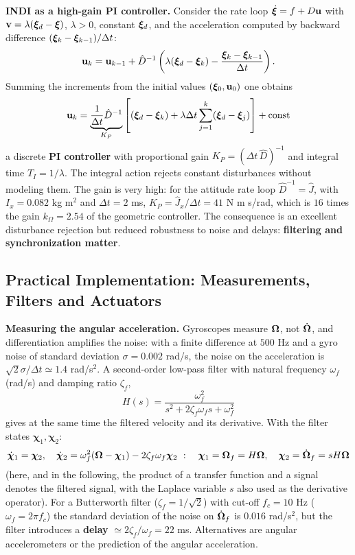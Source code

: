 \documentclass[10pt, a4paper]{report}
\begin{document}
\noindent\textbf{INDI as a high-gain PI controller.} Consider the rate loop $\dot{{\boldsymbol{\xi}}}=f+D\mathbf u$ with $\mathbf v=\lambda({\boldsymbol{\xi}}_d-{\boldsymbol{\xi}})$, $\lambda>0$, constant ${\boldsymbol{\xi}}_d$, and the acceleration computed by backward difference $({\boldsymbol{\xi}}_k-{\boldsymbol{\xi}}_{k-1})/\Delta t$:\begin{equation}
    \mathbf u_k=\mathbf u_{k-1}+\hat D^{-1}\left(\lambda({\boldsymbol{\xi}}_d-{\boldsymbol{\xi}}_k)-\frac{{\boldsymbol{\xi}}_k-{\boldsymbol{\xi}}_{k-1}}{\Delta t}\right).
\end{equation}
Summing the increments from the initial values $({\boldsymbol{\xi}}_0,\mathbf u_0)$ one obtains
\begin{equation}
    \mathbf u_k=\underbrace{\frac{1}{\Delta t}\hat D^{-1}}_{K_P}\left[({\boldsymbol{\xi}}_d-{\boldsymbol{\xi}}_k)+\lambda\Delta t\sum_{j=1}^k({\boldsymbol{\xi}}_d-{\boldsymbol{\xi}}_j)\right]+\text{const}
\end{equation}
a discrete \textbf{PI controller} with proportional gain $K_P=(\Delta t\,\hat D)^{-1}$ and integral time $T_I=1/\lambda$. The integral action rejects constant disturbances without modeling them. The gain is very high: for the attitude rate loop $\hat D^{-1}=\hat J$, with $I_x=0.082$ kg m$^2$ and $\Delta t=2$ ms, $K_P=\hat J_x/\Delta t=41$ N m s/rad, which is $16$ times the gain $k_\Omega=2.54$ of the geometric controller. The consequence is an excellent disturbance rejection but reduced robustness to noise and delays: \textbf{filtering and synchronization matter}.

\subsection{Practical Implementation: Measurements, Filters and Actuators}
\noindent\textbf{Measuring the angular acceleration.} Gyroscopes measure ${\boldsymbol{\Omega}}$, not $\dot{{\boldsymbol{\Omega}}}$, and differentiation amplifies the noise: with a finite difference at $500$ Hz and a gyro noise of standard deviation $\sigma=0.002$ rad/s, the noise on the acceleration is $\sqrt2\sigma/\Delta t\simeq1.4$ rad/s$^2$. A second-order low-pass filter with natural frequency $\omega_f$ (rad/s) and damping ratio $\zeta_f$,
\begin{equation}
    H(s)=\frac{\omega_f^2}{s^2+2\zeta_f\omega_fs+\omega_f^2}
\end{equation}
gives at the same time the filtered velocity and its derivative. With the filter states $\boldsymbol{\chi}_1,\boldsymbol{\chi}_2$:\begin{equation}
    \dot{\boldsymbol{\chi}}_1=\boldsymbol{\chi}_2,\quad\dot{\boldsymbol{\chi}}_2=\omega_f^2(\Bomega-\boldsymbol{\chi}_1)-2\zeta_f\omega_f\boldsymbol{\chi}_2\ :\quad\boldsymbol{\chi}_1=\Bomega_f=H\Bomega,\quad\boldsymbol{\chi}_2=\dot{\Bomega}_f=sH\Bomega
\end{equation}
(here, and in the following, the product of a transfer function and a signal denotes the filtered signal, with the Laplace variable $s$ also used as the derivative operator). For a Butterworth filter ($\zeta_f=1/\sqrt2$) with cut-off $f_c=10$ Hz ($\omega_f=2\pi f_c$) the standard deviation of the noise on $\dot{{\boldsymbol{\Omega}}}_f$ is $0.016$ rad/s$^2$, but the filter introduces a \textbf{delay} $\simeq2\zeta_f/\omega_f=22$ ms. Alternatives are angular accelerometers or the prediction of the angular acceleration.\bigskip
\end{document}
